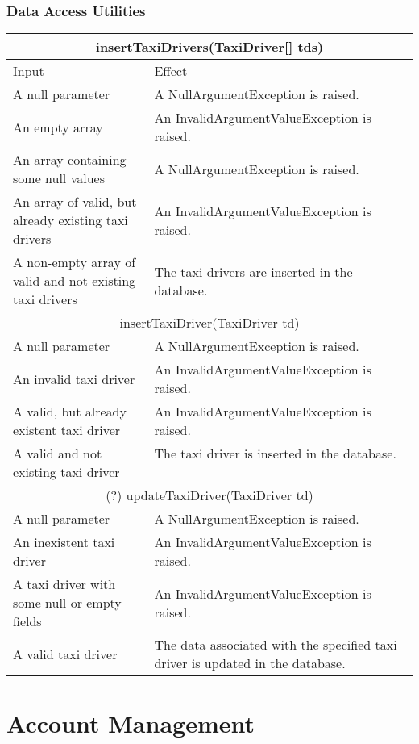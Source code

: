 \documentclass[11pt,oneside,a4paper]{report}
\begin{document}
\subsection{Data Access Utilities}
\begin{tabular}{p{5cm}|p{6cm}}
	\hline
	\multicolumn{2}{c}{insertTaxiDrivers(TaxiDriver[] tds)}\\\hline
	Input & Effect \\\hline
	A null parameter &
	A NullArgumentException is raised.\\\hline
	An empty array &
	An InvalidArgumentValueException is raised.\\\hline
	An array containing some null values &
	A NullArgumentException is raised.\\\hline
	An array of valid, but already existing taxi drivers &
	An InvalidArgumentValueException  is raised. \\\hline
	A non-empty array of valid and not existing taxi drivers &
	The taxi drivers are inserted in the database. \ \\\hline\hline
	
		\multicolumn{2}{c}{insertTaxiDriver(TaxiDriver td)}\\\hline
	A null parameter &
	A NullArgumentException is raised.\\\hline
	An invalid taxi driver &
	An InvalidArgumentValueException  is raised. \\\hline
	A valid, but already existent taxi driver &
	An InvalidArgumentValueException  is raised. \\\hline
	A valid and not existing taxi driver &
	The taxi driver is inserted in the database. \ \\\hline\hline

	\multicolumn{2}{c}{(?) updateTaxiDriver(TaxiDriver td)}\\\hline
	A null parameter &
	A NullArgumentException is raised. \\\hline
	An inexistent taxi driver &
	An InvalidArgumentValueException is raised. \\\hline
	A taxi driver with some null or empty fields &
	An InvalidArgumentValueException is raised. \\\hline
	A valid taxi driver &
	The data associated with the specified taxi driver is updated in the database. \\\hline	
\end{tabular}


\chapter{Account Management}
\end{document}
